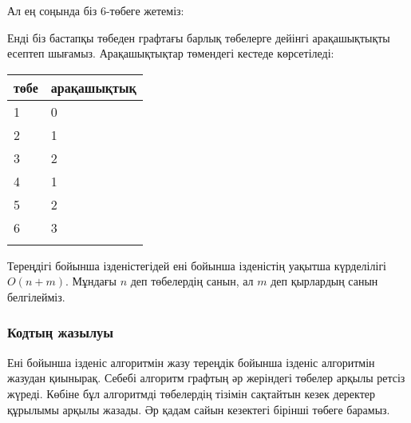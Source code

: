 Ал ең соңында біз $6$-төбеге жетеміз:
\begin{center}
\end{center}
Енді біз бастапқы төбеден графтағы барлық төбелерге дейінгі арақашықтықты есептеп шығамыз. Арақашықтықтар төмендегі кестеде көрсетіледі:

\begin{tabular}{ll}
\\
төбе & арақашықтық \\
\hline
1 & 0 \\
2 & 1 \\
3 & 2 \\
4 & 1 \\
5 & 2 \\
6 & 3 \\
\\
\end{tabular}

Тереңдігі бойынша ізденістегідей ені бойынша ізденістің 
уақытша күрделілігі $O(n+m)$. Мұндағы $n$ деп төбелердің санын,
ал $m$ деп қырлардың санын белгілейміз.

\subsubsection*{Кодтың жазылуы}

Ені бойынша ізденіс алгоритмін жазу тереңдік бойынша ізденіс
алгоритмін жазудан қиынырақ. Себебі алгоритм графтың әр жеріндегі төбелер арқылы ретсіз жүреді.
Көбіне бұл алгоритмді төбелердің тізімін сақтайтын кезек деректер құрылымы арқылы жазады.
Әр қадам сайын кезектегі бірінші төбеге барамыз.

